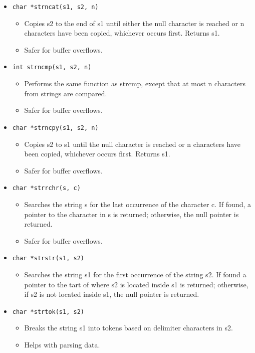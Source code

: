 \begin{itemize}
    \item \texttt{char *strncat(s1, s2, n)}
        \begin{itemize}
            \item Copies s2 to the end of s1 until either the null character is reached or n characters have been copied, whichever occurs first. Returns s1.
            \item Safer for buffer overflows.
        \end{itemize}
    
    \item \texttt{int strncmp(s1, s2, n)}
        \begin{itemize}
            \item Performs the same function as strcmp, except that at most n characters from strings are compared.
            \item Safer for buffer overflows.
        \end{itemize}
    
    \item \texttt{char *strncpy(s1, s2, n)}
        \begin{itemize}
            \item Copies s2 to s1 until the null character is reached or n characters have been copied, whichever occurs first. Returns s1. 
            \item Safer for buffer overflows.
        \end{itemize}
    
    \item \texttt{char *strrchr(s, c)}
        \begin{itemize}
            \item Searches the string s for the last occurrence of the character c. If found, a pointer to the character in s is returned; otherwise, the null pointer is returned.
            \item Safer for buffer overflows.
        \end{itemize}
    
    \item \texttt{char *strstr(s1, s2)}
        \begin{itemize}
            \item Searches the string s1 for the first occurrence of the string s2. If found a pointer to the tart of where s2 is located inside s1 is returned; otherwise, if s2 is not located inside s1, the null pointer is returned. 
        \end{itemize}
    
    \item \texttt{char *strtok(s1, s2)}
        \begin{itemize}
            \item Breaks the string s1 into tokens based on delimiter characters in s2.
            \item Helps with parsing data.
        \end{itemize}
\end{itemize}

